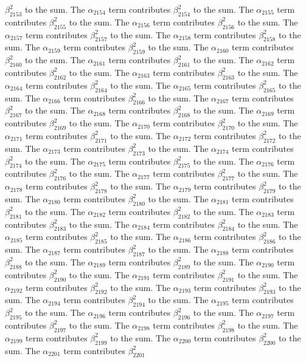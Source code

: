 \begin{lemma}
$\beta_{2153}^{2}$ to the sum. The $\alpha_{2154}$ term contributes $\beta_{2154}^{2}$ to the sum. The $\alpha_{2155}$ term contributes $\beta_{2155}^{2}$ to the sum. The $\alpha_{2156}$ term contributes $\beta_{2156}^{2}$ to the sum. The $\alpha_{2157}$ term contributes $\beta_{2157}^{2}$ to the sum. The $\alpha_{2158}$ term contributes $\beta_{2158}^{2}$ to the sum. The $\alpha_{2159}$ term contributes $\beta_{2159}^{2}$ to the sum. The $\alpha_{2160}$ term contributes $\beta_{2160}^{2}$ to the sum. The $\alpha_{2161}$ term contributes $\beta_{2161}^{2}$ to the sum. The $\alpha_{2162}$ term contributes $\beta_{2162}^{2}$ to the sum. The $\alpha_{2163}$ term contributes $\beta_{2163}^{2}$ to the sum. The $\alpha_{2164}$ term contributes $\beta_{2164}^{2}$ to the sum. The $\alpha_{2165}$ term contributes $\beta_{2165}^{2}$ to the sum. The $\alpha_{2166}$ term contributes $\beta_{2166}^{2}$ to the sum. The $\alpha_{2167}$ term contributes $\beta_{2167}^{2}$ to the sum. The $\alpha_{2168}$ term contributes $\beta_{2168}^{2}$ to the sum. The $\alpha_{2169}$ term contributes $\beta_{2169}^{2}$ to the sum. The $\alpha_{2170}$ term contributes $\beta_{2170}^{2}$ to the sum. The $\alpha_{2171}$ term contributes $\beta_{2171}^{2}$ to the sum. The $\alpha_{2172}$ term contributes $\beta_{2172}^{2}$ to the sum. The $\alpha_{2173}$ term contributes $\beta_{2173}^{2}$ to the sum. The $\alpha_{2174}$ term contributes $\beta_{2174}^{2}$ to the sum. The $\alpha_{2175}$ term contributes $\beta_{2175}^{2}$ to the sum. The $\alpha_{2176}$ term contributes $\beta_{2176}^{2}$ to the sum. The $\alpha_{2177}$ term contributes $\beta_{2177}^{2}$ to the sum. The $\alpha_{2178}$ term contributes $\beta_{2178}^{2}$ to the sum. The $\alpha_{2179}$ term contributes $\beta_{2179}^{2}$ to the sum. The $\alpha_{2180}$ term contributes $\beta_{2180}^{2}$ to the sum. The $\alpha_{2181}$ term contributes $\beta_{2181}^{2}$ to the sum. The $\alpha_{2182}$ term contributes $\beta_{2182}^{2}$ to the sum. The $\alpha_{2183}$ term contributes $\beta_{2183}^{2}$ to the sum. The $\alpha_{2184}$ term contributes $\beta_{2184}^{2}$ to the sum. The $\alpha_{2185}$ term contributes $\beta_{2185}^{2}$ to the sum. The $\alpha_{2186}$ term contributes $\beta_{2186}^{2}$ to the sum. The $\alpha_{2187}$ term contributes $\beta_{2187}^{2}$ to the sum. The $\alpha_{2188}$ term contributes $\beta_{2188}^{2}$ to the sum. The $\alpha_{2189}$ term contributes $\beta_{2189}^{2}$ to the sum. The $\alpha_{2190}$ term contributes $\beta_{2190}^{2}$ to the sum. The $\alpha_{2191}$ term contributes $\beta_{2191}^{2}$ to the sum. The $\alpha_{2192}$ term contributes $\beta_{2192}^{2}$ to the sum. The $\alpha_{2193}$ term contributes $\beta_{2193}^{2}$ to the sum. The $\alpha_{2194}$ term contributes $\beta_{2194}^{2}$ to the sum. The $\alpha_{2195}$ term contributes $\beta_{2195}^{2}$ to the sum. The $\alpha_{2196}$ term contributes $\beta_{2196}^{2}$ to the sum. The $\alpha_{2197}$ term contributes $\beta_{2197}^{2}$ to the sum. The $\alpha_{2198}$ term contributes $\beta_{2198}^{2}$ to the sum. The $\alpha_{2199}$ term contributes $\beta_{2199}^{2}$ to the sum. The $\alpha_{2200}$ term contributes $\beta_{2200}^{2}$ to the sum. The $\alpha_{2201}$ term contributes $\beta_{2201}^{2}$ 
\end{lemma}
